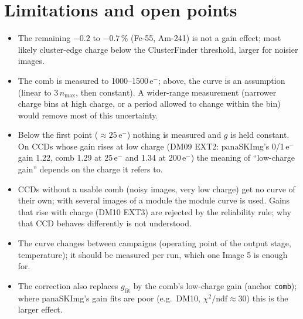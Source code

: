 \documentclass[11pt,a4paper]{article}
\newcommand{\code}[1]{\texttt{#1}}
\newcommand{\eminus}{e$^-$}
\newcommand{\gfit}{g_{\mathrm{fit}}}
\newcommand{\nmax}{n_{\mathrm{max}}}
\begin{document}
\section{Limitations and open points}
\begin{itemize}
\item The remaining $-0.2$ to $-0.7$\,\% (Fe-55, Am-241) is not a gain effect; most likely cluster-edge charge
below the ClusterFinder threshold, larger for noisier images.
\item The comb is measured to 1000--1500\,\eminus; above, the curve is an assumption (linear to $3\,\nmax$,
then constant). A wider-range measurement (narrower charge bins at high charge, or a period allowed to
change within the bin) would remove most of this uncertainty.
\item Below the first point ($\approx 25$\,\eminus) nothing is measured and $g$ is held constant. On CCDs whose
gain rises at low charge (DM09 EXT2: panaSKImg's 0/1\,\eminus{} gain 1.22, comb 1.29 at 25\,\eminus{} and
1.34 at 200\,\eminus) the meaning of ``low-charge gain'' depends on the charge it refers to.
\item CCDs without a usable comb (noisy images, very low charge) get no curve of their own; with several
images of a module the module curve is used. Gains that rise with charge (DM10 EXT3) are rejected by the
reliability rule; why that CCD behaves differently is not understood.
\item The curve changes between campaigns (operating point of the output stage, temperature); it should be
measured per run, which one Image 5 is enough for.
\item The correction also replaces $\gfit$ by the comb's low-charge gain (anchor \code{comb}); where panaSKImg's
gain fits are poor (e.g.\ DM10, $\chi^2/\mathrm{ndf} \approx 30$) this is the larger effect.
\end{itemize}

\appendix
\end{document}
